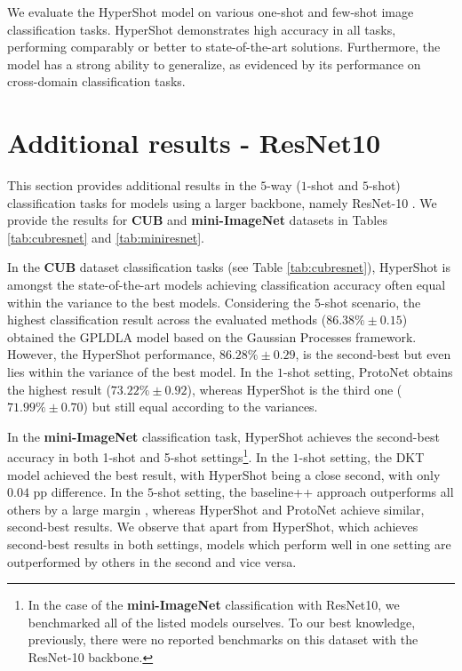 \documentclass[nohyperref]{article}
\def\our{HyperShot}
\theoremstyle{plain}
\theoremstyle{definition}
\theoremstyle{remark}
\begin{document}
We evaluate the \our{} model on various one-shot and few-shot image classification tasks. \our{} demonstrates high accuracy in all tasks, performing comparably or better to state-of-the-art solutions. Furthermore, the model has a strong ability to generalize, as evidenced by its performance on cross-domain classification tasks.





\newpage
\appendix
\onecolumn
\section{Additional results - ResNet10}
\label{app:resnet}

This section provides additional results in the $5$-way ($1$-shot and $5$-shot) classification tasks for models using a larger backbone, namely ResNet-10 \cite{he2015resnet}. We provide the results for \textbf{CUB} and \textbf{mini-ImageNet} datasets in Tables \ref{tab:cubresnet} and \ref{tab:miniresnet}. 


In the \textbf{CUB} dataset classification tasks (see Table \ref{tab:cubresnet}), \our{} is amongst the state-of-the-art models achieving classification accuracy often equal within the variance to the best models. Considering the $5$-shot scenario, the highest classification result across the evaluated methods ($86.38\% \pm 0.15$) obtained the GPLDLA model based on the Gaussian Processes framework. However, the \our{} performance, $86.28\% \pm 0.29$, is the second-best but even lies within the variance of the best model. In the $1$-shot setting, ProtoNet obtains the highest result ($73.22\% \pm 0.92$), whereas \our{} is the third one ($71.99\% \pm 0.70$) but still equal according to the variances.

In the \textbf{mini-ImageNet} classification task, \our{} achieves the second-best accuracy in both 1-shot and 5-shot settings\footnote{In the case of the \textbf{mini-ImageNet} classification with ResNet10, we benchmarked all of the listed models ourselves. To our best knowledge, previously, there were no reported benchmarks on this dataset with the ResNet-10 backbone.}. In the $1$-shot setting, the DKT model \cite{patacchiola2020bayesian} achieved the best result, with \our{} being a close second, with only $0.04$ pp difference. In the $5$-shot setting, the baseline++ approach outperforms all others by a large margin \cite{chen2019closer}, whereas \our{} and ProtoNet \cite{snell2017prototypical} achieve similar, second-best results. We observe that apart from \our{}, which achieves second-best results in both settings, models which perform well in one setting are outperformed by others in the second and vice versa.
\end{document}
